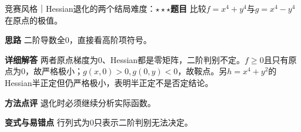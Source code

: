 \begin{example}{竞赛风格｜Hessian退化的两个结局}{难度：$\star\star\star$}\label{deep:ex:multivariable_source_deep:degenerate}\textbf{题目} 比较$f=x^4+y^4$与$g=x^4-y^4$在原点的极值。\par\textbf{思路} 二阶导数全0，直接看高阶项符号。\par\textbf{详细解答} 两者原点梯度为0、Hessian都是零矩阵，二阶判别不定。$f\ge0$且只有原点为0，故严格极小；$g(x,0)>0,g(0,y)<0$，故鞍点。另$h=x^4+y^2$的Hessian半正定但仍严格极小，表明半正定不是否定结论。\par\textbf{方法点评} 退化时必须继续分析实际函数。\par\textbf{变式与易错点} 行列式为0只表示二阶判别无法决定。\end{example}
